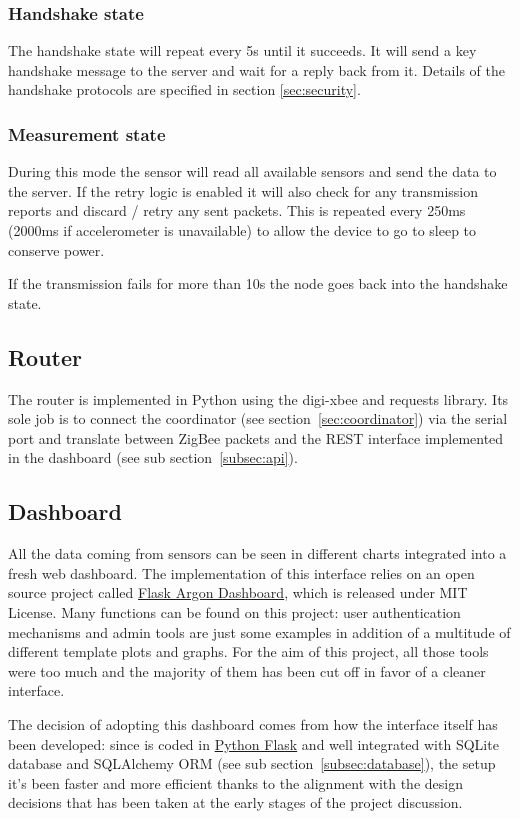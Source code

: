 \documentclass[a4paper,11pt]{scrartcl}
\begin{document}
\subsubsection*{Handshake state}
The handshake state will repeat every 5s until it succeeds. It will send a key handshake message to the server and wait for a reply back from it. Details of the handshake protocols are specified in section \ref{sec:security}.

\subsubsection*{Measurement state}
During this mode the sensor will read all available sensors and send the data to the server. If the retry logic is enabled it will also check for any transmission reports and discard / retry any sent packets. This is repeated every 250ms (2000ms if accelerometer is unavailable) to allow the device to go to sleep to conserve power.

If the transmission fails for more than 10s the node goes back into the handshake state.

\subsection{Router}\label{subsec:router}
The router is implemented in Python using the digi-xbee and requests library. Its sole job is to connect the coordinator (see section~\ref{sec:coordinator}) via the serial port and translate between ZigBee packets and the REST interface implemented in the dashboard (see sub section~\ref{subsec:api}).

\subsection{Dashboard}
All the data coming from sensors can be seen in different charts integrated into a fresh web dashboard. The implementation of this interface relies on an open source project called \href{https://github.com/app-generator/flask-argon-dashboard}{Flask Argon Dashboard}, which is released under MIT License. Many functions can be found on this project: user authentication mechanisms and admin tools are just some examples in addition of a multitude of different template plots and graphs. For the aim of this project, all those tools were too much and the majority of them has been cut off in favor of a cleaner interface.

The decision of adopting this dashboard comes from how the interface itself has been developed: since is coded in \href{https://palletsprojects.com/p/flask/}{Python Flask} and well integrated with SQLite database and SQLAlchemy ORM (see sub section~\ref{subsec:database}), the setup it's been faster and more efficient thanks to the alignment with the design decisions that has been taken at the early stages of the project discussion.
\end{document}
